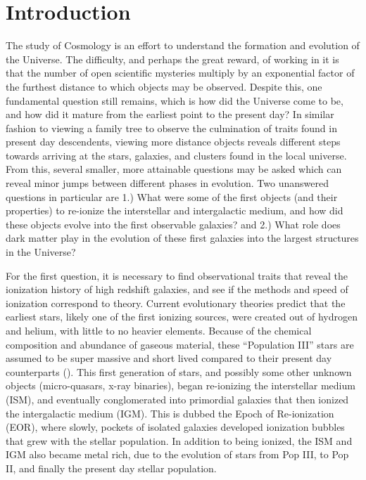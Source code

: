 \documentclass[manuscript]{aastex}
\begin{document}
\newpage
\tableofcontents
\listoffigures

\newpage
\renewcommand{\thepage}{\arabic{page}}
\setcounter{page}{1}

\section{\textbf{Introduction}}
The study of Cosmology is an effort to understand the formation and evolution of the Universe. The difficulty, and perhaps the great reward, of working in it is that the number of open scientific mysteries multiply by an exponential factor of the furthest distance to which objects may be observed. Despite this, one fundamental question still remains, which is how did the Universe come to be, and how did it mature from the earliest point to the present day? In similar fashion to viewing a family tree to observe the culmination of traits found in present day descendents, viewing more distance objects reveals different steps towards arriving at the stars, galaxies, and clusters found in the local universe. From this, several smaller, more attainable questions may be asked which can reveal minor jumps between different phases in evolution. Two unanswered questions in particular are 1.) What were some of the first objects (and their properties) to re-ionize the interstellar and intergalactic medium, and how did these objects evolve into the first observable galaxies? and 2.) What role does dark matter play in the evolution of these first galaxies into the largest structures in the Universe? 

For the first question, it is necessary to find observational traits that reveal the ionization history of high redshift galaxies, and see if the methods and speed of ionization correspond to theory. Current evolutionary theories predict that the earliest stars, likely one of the first ionizing sources, were created out of hydrogen and helium, with little to no heavier elements. Because of the chemical composition and abundance of gaseous material, these ``Population III'' stars are assumed to be super massive and short lived compared to their present day counterparts (\cite{Zaroubi2012}). This first generation of stars, and possibly some other unknown objects (micro-quasars, x-ray binaries), began re-ionizing the interstellar medium (ISM), and eventually conglomerated into primordial galaxies that then ionized the intergalactic medium (IGM). This is dubbed the Epoch of Re-ionization (EOR), where slowly, pockets of isolated galaxies developed ionization bubbles that grew with the stellar population. In addition to being ionized, the ISM and IGM also became metal rich, due to the evolution of stars from Pop III, to Pop II, and finally the present day stellar population. 
\end{document}
